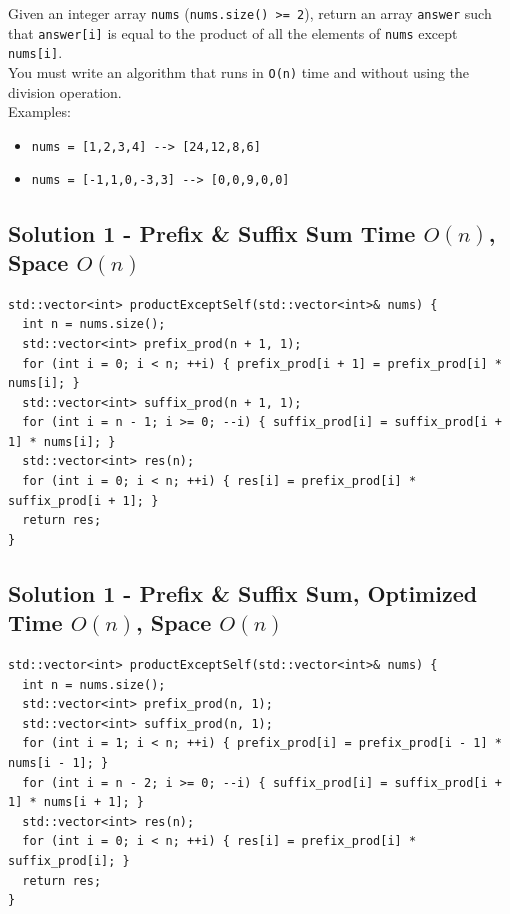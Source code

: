 Given an integer array {\colorbox{CodeBackground}{\lstinline|nums|}} ({\colorbox{CodeBackground}{\lstinline|nums.size() >= 2|}}), return an array {\colorbox{CodeBackground}{\lstinline|answer|}} such that {\colorbox{CodeBackground}{\lstinline|answer[i]|}} is equal to the product of all the elements of {\colorbox{CodeBackground}{\lstinline|nums|}} except {\colorbox{CodeBackground}{\lstinline|nums[i]|}}.\\

You must write an algorithm that runs in {\colorbox{CodeBackground}{\lstinline|O(n)|}} time and without using the division operation.\\

Examples:
\begin{itemize}
	\item {\colorbox{CodeBackground}{\lstinline|nums = [1,2,3,4] --> [24,12,8,6]|}}
	\item {\colorbox{CodeBackground}{\lstinline|nums = [-1,1,0,-3,3] --> [0,0,9,0,0]|}}
\end{itemize}

\subsection*{Solution 1 - Prefix \& Suffix Sum {\scriptsize\color{gray}\Coffeecup\hspace{1mm}Time $O(n)$, Space $O(n)$}}
\begin{lstlisting}
std::vector<int> productExceptSelf(std::vector<int>& nums) {
  int n = nums.size();
  std::vector<int> prefix_prod(n + 1, 1);
  for (int i = 0; i < n; ++i) { prefix_prod[i + 1] = prefix_prod[i] * nums[i]; }
  std::vector<int> suffix_prod(n + 1, 1);
  for (int i = n - 1; i >= 0; --i) { suffix_prod[i] = suffix_prod[i + 1] * nums[i]; }
  std::vector<int> res(n);
  for (int i = 0; i < n; ++i) { res[i] = prefix_prod[i] * suffix_prod[i + 1]; }
  return res;
}
\end{lstlisting}

\subsection*{Solution 1 - Prefix \& Suffix Sum, Optimized {\scriptsize\color{gray}\Coffeecup\hspace{1mm}Time $O(n)$, Space $O(n)$}}
\begin{lstlisting}
std::vector<int> productExceptSelf(std::vector<int>& nums) {
  int n = nums.size();
  std::vector<int> prefix_prod(n, 1);
  std::vector<int> suffix_prod(n, 1);
  for (int i = 1; i < n; ++i) { prefix_prod[i] = prefix_prod[i - 1] * nums[i - 1]; }
  for (int i = n - 2; i >= 0; --i) { suffix_prod[i] = suffix_prod[i + 1] * nums[i + 1]; }
  std::vector<int> res(n);
  for (int i = 0; i < n; ++i) { res[i] = prefix_prod[i] * suffix_prod[i]; }
  return res;
}
\end{lstlisting}

